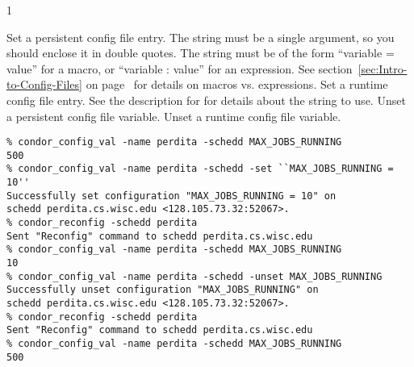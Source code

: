 \begin{ManPage}{\label{man-condor-config-val}}{1}
\begin{Options}
	 { Set a persistent
	config file entry.
	The string must be a single argument, so you should enclose it
	in double quotes.
	The string must be of the form ``variable = value'' for a
	macro, or ``variable : value'' for an expression.
	See section~\ref{sec:Intro-to-Config-Files} on
	page~\pageref{sec:Intro-to-Config-Files} for details on macros
	vs. expressions. }
	 { Set a runtime
	config file entry.
	See the description for  for details about the
	string to use. } 
	 { Unset a persistent
	config file variable. }
	 { Unset a runtime
	config file variable. }
\end{Options}

\Examples

\begin{verbatim}
% condor_config_val -name perdita -schedd MAX_JOBS_RUNNING
500
% condor_config_val -name perdita -schedd -set ``MAX_JOBS_RUNNING = 10''
Successfully set configuration "MAX_JOBS_RUNNING = 10" on 
schedd perdita.cs.wisc.edu <128.105.73.32:52067>.
% condor_reconfig -schedd perdita
Sent "Reconfig" command to schedd perdita.cs.wisc.edu
% condor_config_val -name perdita -schedd MAX_JOBS_RUNNING
10
% condor_config_val -name perdita -schedd -unset MAX_JOBS_RUNNING
Successfully unset configuration "MAX_JOBS_RUNNING" on 
schedd perdita.cs.wisc.edu <128.105.73.32:52067>.
% condor_reconfig -schedd perdita
Sent "Reconfig" command to schedd perdita.cs.wisc.edu
% condor_config_val -name perdita -schedd MAX_JOBS_RUNNING
500
\end{verbatim}

\end{ManPage}
